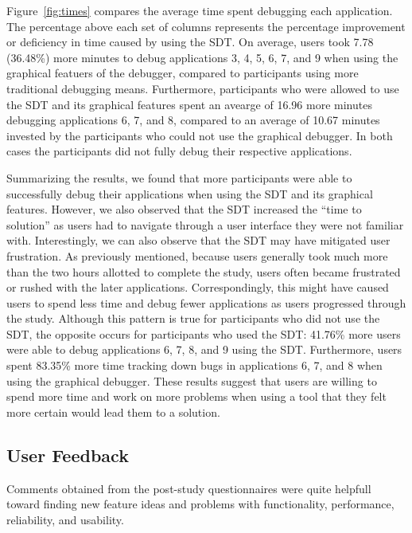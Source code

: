 \documentclass[11pt, letterpaper, onecolumn]{article}
\begin{document}
Figure~\ref{fig:times} compares the  average time spent debugging each
application. The  percentage above each set of  columns represents the
percentage improvement or deficiency in  time caused by using the SDT.
On  average,   users  took  7.78  (36.48\%)  more   minutes  to  debug
applications 3, 4, 5, 6, 7, and 9 when using the graphical featuers of
the  debugger,   compared  to  participants   using  more  traditional
debugging means. Furthermore, participants who were allowed to use the
SDT and its graphical features  spent an avearge of 16.96 more minutes
debugging applications  6, 7,  and 8, compared  to an average  of 10.67
minutes invested by  the participants who could not  use the graphical
debugger. In  both cases  the participants did  not fully  debug their
respective applications.

Summarizing the results, we found  that more participants were able to
successfully  debug their  applications  when using  the  SDT and  its
graphical features.  However, we  also observed that the SDT increased
the  ``time to  solution'' as  users had  to navigate  through  a user
interface  they were  not familiar  with. Interestingly,  we  can also
observe  that  the  SDT  may  have  mitigated  user  frustration.   As
previously mentioned, because users  generally took much more than the
two  hours  allotted  to   complete  the  study,  users  often  became
frustrated  or rushed  with the  later  applications. Correspondingly,
this  might have  caused  users to  spend  less time  and debug  fewer
applications  as users  progressed  through the  study. Although  this
pattern is true for participants who did not use the SDT, the opposite
occurs for participants who used the SDT: 41.76\% more users were able
to debug applications 6, 7, 8, and 9 using the SDT. Furthermore, users
spent 83.35\% more time tracking down bugs in applications 6, 7, and 8
when using  the graphical debugger.  These results  suggest that users
are willing to spend more time  and work on more problems when using a
tool that they felt more certain would lead them to a solution.


\subsection{User Feedback}

Comments  obtained  from  the  post-study  questionnaires  were  quite
helpfull  toward   finding  new   feature  ideas  and   problems  with
functionality, performance, reliability, and usability.
\end{document}
